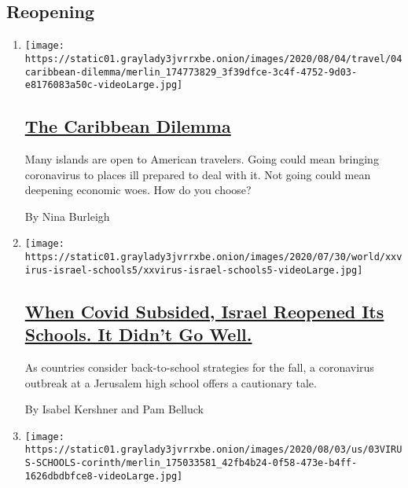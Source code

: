 \hypertarget{reopening}{%
\subsection{Reopening}\label{reopening}}

\begin{enumerate}
\def\labelenumi{\arabic{enumi}.}
\item
  \texttt{[image: https://static01.graylady3jvrrxbe.onion/images/2020/08/04/travel/04caribbean-dilemma/merlin\_174773829\_3f39dfce-3c4f-4752-9d03-e8176083a50c-videoLarge.jpg]}

  \hypertarget{the-caribbean-dilemma}{%
  \subsection{\texorpdfstring{\href{/2020/08/04/travel/coronavirus-caribbean-vacations.html}{The
  Caribbean
  Dilemma}}{The Caribbean Dilemma}}\label{the-caribbean-dilemma}}

  Many islands are open to American travelers. Going could mean bringing
  coronavirus to places ill prepared to deal with it. Not going could
  mean deepening economic woes. How do you choose?

  By Nina Burleigh
\item
  \texttt{[image: https://static01.graylady3jvrrxbe.onion/images/2020/07/30/world/xxvirus-israel-schools5/xxvirus-israel-schools5-videoLarge.jpg]}

  \hypertarget{when-covid-subsided-israel-reopened-its-schools-it-didnt-go-well}{%
  \subsection{\texorpdfstring{\href{/2020/08/04/world/middleeast/coronavirus-israel-schools-reopen.html}{When
  Covid Subsided, Israel Reopened Its Schools. It Didn't Go
  Well.}}{When Covid Subsided, Israel Reopened Its Schools. It Didn't Go Well.}}\label{when-covid-subsided-israel-reopened-its-schools-it-didnt-go-well}}

  As countries consider back-to-school strategies for the fall, a
  coronavirus outbreak at a Jerusalem high school offers a cautionary
  tale.

  By Isabel Kershner and Pam Belluck
\item
  \texttt{[image: https://static01.graylady3jvrrxbe.onion/images/2020/08/03/us/03VIRUS-SCHOOLS-corinth/merlin\_175033581\_42fb4b24-0f58-473e-b4ff-1626dbdbfce8-videoLarge.jpg]}


\end{enumerate}
